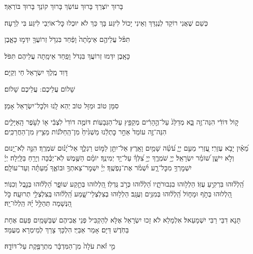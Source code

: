 \documentclass[twoside, openany, parskip=half, 11pt]{book}
\begin{document}
בָּרוּךְ יוֹצְרֵךְ בָּרוּךְ עוֹשֵׂךְ בָּרוּךְ קוֹנֵךְ בָּרוּךְ בּוֹרְאֵךְ׃

כְּשֵׁם שֶׁאֲנִי רוֹקֵד לְנֶגְדֵּךְ וְאֵינִי יָכוֹל לִיגַּע בָּךְ כַּךְ לֹא יוּכְלוּ כׇּל־אוֹיְבַי לִיגַּע בִּי לְרָעָה׃ 

תִּפֹּ֨ל עֲלֵיהֶ֤ם אֵימָ֙תָה֙ וָפַ֔חַד בִּגְדֹ֥ל זְרוֹעֲךָ֖ יִדְּמ֣וּ כָּאָ֑בֶן 

כָּאָֽבֶן יִדְּמוּ זְרוֹעֲךָ בִּגְדֹל וָפַֽחַד אֵימָֽתָה עֲלֵיהֶם תִּפֹּל׃ 


דָּוִד מֶֽלֶךְ יִשְׂרָאֵל חַי וְקַיָּם׃ 

שָׁלוֹם עֲלֵיכֶם: \qquad {}
עֲלֵיכֶם שָׁלוֹם׃

סִמָּן טוֹב וּמַזָּל טוֹב יְהֵא לָֽנוּ וּלְכׇל־יִשְׂרָאֵל אָמֵן׃ 

ק֣וֹל דּוֹדִ֔י הִנֵּה־זֶ֖ה בָּ֑א מְדַלֵּג֙ עַל־הֶ֣הָרִ֔ים מְקַפֵּ֖ץ עַל־הַגְּבָעֽוֹת׃ דּוֹמֶ֤ה דוֹדִי֙ לִצְבִ֔י א֖וֹ לְעֹ֣פֶר הָֽאַיָּלִ֑ים הִנֵּה־זֶ֤ה עוֹמֵד֙ אַחַ֣ר כׇּתְלֵ֔נוּ מַשְׁגִּ֙יחַ֙ מִן־הַֽחַלֹּנ֔וֹת מֵצִ֖יץ מִן־הַחֲרַכִּֽים׃

מֵ֝אַ֗יִן יָבֹ֥א עֶזְרִֽי׃
עֶ֭זְרִי מֵעִ֣ם יְיָ֑ עֹ֝שֵׂ֗ה שָׁמַ֥יִם וָאָֽרֶץ׃
אַל־יִתֵּ֣ן לַמּ֣וֹט רַגְלֶ֑ךָ אַל־יָ֝נ֗וּם שֹׁמְרֶֽךָ׃
הִנֵּ֣ה לֹֽא־יָ֭נוּם וְלֹ֣א יִישָׁ֑ן שׁ֝וֹמֵ֗ר יִשְׂרָאֵֽל׃
יְיָ֥ שֹׁמְרֶ֑ךָ יְיָ֥ צִ֝לְּךָ֗ עַל־יַ֥ד יְמִינֶֽךָ׃
יוֹמָ֗ם הַשֶּׁ֥מֶשׁ לֹֽא־יַכֶּ֗כָּה וְיָרֵ֥חַ בַּלָּֽיְלָה׃
יְיָ֗ יִשְׁמׇרְךָ֥ מִכׇּל־רָ֑ע יִ֝שְׁמֹ֗ר אֶת־נַפְשֶֽׁךָ׃
יְיָ֗ יִשְׁמׇר־צֵאתְךָ֥ וּבוֹאֶ֑ךָ מֵ֝עַתָּ֗ה וְעַד־עוֹלָֽם׃

הַֽ֝לְל֗וּהוּ בִּרְקִ֥יעַ עֻזּֽוֹ׃
הַלְל֥וּהוּ בִגְבוּרֹתָ֑יו הַ֝לְל֗וּהוּ כְּרֹ֣ב גֻּדְלֽוֹ׃
הַ֭לְלוּהוּ בְּתֵ֣קַע שׁוֹפָ֑ר הַ֝לְל֗וּהוּ בְּנֵ֣בֶל וְכִנּֽוֹר׃
הַ֭לְלוּהוּ בְּתֹ֣ף וּמָח֑וֹל הַֽ֝לְל֗וּהוּ בְּמִנִּ֥ים וְעֻגָֽב׃
הַלְל֥וּהוּ בְצִלְצְלֵי־שָׁ֑מַע הַֽ֝לְל֗וּהוּ בְּֽצִלְצְלֵ֥י תְרוּעָֽה׃
כֹּ֣ל הַ֭נְּשָׁמָה תְּהַלֵּ֥ל יָ֗הּ הַֽלְלוּ־יָֽהּ׃


תָּנָא דִבֵּי רַבִּי יִשְׁמָעֵאל׃ אִלְמָלֵא לֹא זָכוּ יִשְׂרָאֵל אֶלָּא לְהַקְבִּיל פְּנֵי אֲבִיהֶם שֶׁבַּשָּׁמַֽיִם פַּעַם אֶחָת בַּחֹֽדֶשׁ דַּיָּם׃ אָמַר אַבַּיֵּי׃ הִלְכָּךְ צָרֵךְ לְמֵימְרָא מְעֻמָּד׃

מִ֣י זֹ֗את עֹלָה֙ מִן־הַמִּדְבָּ֔ר מִתְרַפֶּ֖קֶת עַל־דּוֹדָ֑הּ׃
\end{document}
